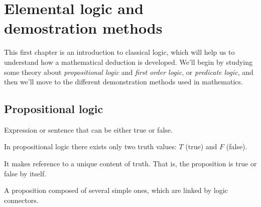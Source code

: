 \chapter[Elemental logic and demonstration methods]{Elemental logic and \\ demostration methods}
\thispagestyle{noheaders}

This first chapter is an introduction to classical logic, which will help us to understand how a mathematical
deduction is developed. We'll begin by studying some theory about \textit{propositional logic} and 
\textit{first order logic}, or \textit{predicate logic}, and then we'll move to the different demonstration methods 
used in mathematics.

\section{Propositional logic}

\begin{defn}
    Expression or sentence that can be either true or false. 
\end{defn}

\begin{note}
    In propositional logic there exists only two truth values: $T$ (true) and $F$ (false).
\end{note}

\begin{defn}
It makes reference to a unique content of truth. That is, the proposition is true or false by itself.
\end{defn}

\begin{defn}
    A proposition composed of several simple ones, which are linked by logic connectors.
\end{defn}


